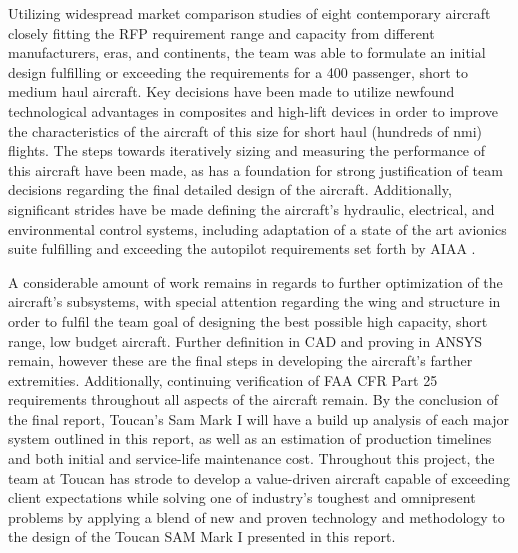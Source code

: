 Utilizing widespread market comparison studies of eight contemporary aircraft closely fitting the RFP \cite{RFP} requirement range and capacity from different manufacturers, eras, and continents, the team was able to formulate an initial design fulfilling or exceeding the requirements for a 400 passenger, short to medium haul aircraft. Key decisions have been made to utilize newfound technological advantages in composites and high-lift devices in order to improve the characteristics of the aircraft of this size for short haul (hundreds of nmi) flights.  The steps towards iteratively sizing and measuring the performance of this aircraft have been made, as has a foundation for strong justification of team decisions regarding the final detailed design of the aircraft.  Additionally, significant strides have be made defining the aircraft's hydraulic, electrical, and environmental control systems, including adaptation of a state of the art avionics suite fulfilling and exceeding the autopilot requirements set forth by AIAA \cite{RFP}.

A considerable amount of work remains in regards to further optimization of the aircraft's subsystems, with special attention regarding the wing and structure in order to fulfil the team goal of designing the best possible high capacity, short range, low budget aircraft. Further definition in CAD and proving in ANSYS remain, however these are the final steps in developing the aircraft's farther extremities.  Additionally, continuing verification of FAA CFR Part 25 \cite{cfr} requirements throughout all aspects of the aircraft remain.  By the conclusion of the final report, Toucan's Sam Mark I will have a build up analysis of each major system outlined in this report, as well as an estimation of production timelines and both initial and service-life maintenance cost.  Throughout this project, the team at Toucan has strode to develop a value-driven aircraft capable of exceeding client expectations while solving one of industry's toughest and omnipresent problems by applying a blend of new and proven technology and methodology to the design of the Toucan SAM Mark I presented in this report.  




